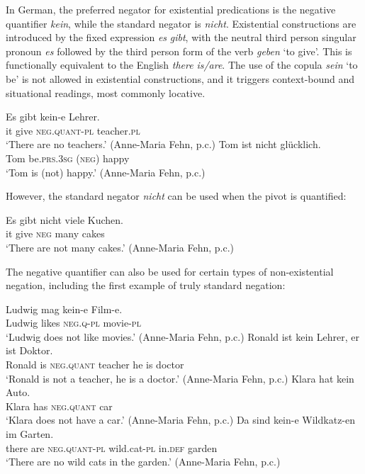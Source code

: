 \documentclass[output=paper,colorlinks,citecolor=brown]{langscibook}
\begin{document}
\begin{paperappendix}
\begin{unindented}

In German, the preferred negator for existential predications is the negative quantifier \textit{kein}, while the standard negator is \textit{nicht}. Existential constructions are introduced by the fixed expression \textit{es} \textit{gibt}, with the neutral third person singular pronoun \textit{es} followed by the third person form of the verb \textit{geben} `to give'. This is functionally equivalent to the English \textit{there} \textit{is/are}. The use of the copula \textit{sein} `to be' is not allowed in existential constructions, and it triggers context-bound and situational readings, most commonly locative. 
%
\begin{exe}\ex \gll Es gibt  kein-e Lehrer.  \\
it   give \textsc{neg.quant-pl} teacher.\textsc{pl} \\
    \glt `There are no teachers.' (Anne-Maria Fehn, p.c.)
\ex \gll Tom ist {\op}nicht{\cp} glücklich. \\
Tom be.\textsc{prs.3sg} (\textsc{neg}) happy \\
    \glt `Tom is (not) happy.' (Anne-Maria Fehn, p.c.)
    \end{exe}

However, the standard negator \textit{nicht} can be used when the pivot is quantified:
%
\begin{exe}\ex \gll Es gibt nicht viele   Kuchen. \\
it   give \textsc{neg}  many cakes \\
    \glt `There are not many cakes.' (Anne-Maria Fehn, p.c.)
    \end{exe}

The negative quantifier can also be used for certain types of non-existential negation, including the first example of truly standard negation:
%
\begin{exe}\ex \gll Ludwig mag kein-e Film-e.  \\
Ludwig likes \textsc{neg.q-pl} movie-\textsc{pl} \\
    \glt `Ludwig does not like movies.' (Anne-Maria Fehn, p.c.)
\ex \gll Ronald ist kein Lehrer, er ist Doktor.  \\
Ronald is  \textsc{neg.quant} teacher he is doctor \\
    \glt `Ronald is not a teacher, he is a doctor.' (Anne-Maria Fehn, p.c.)
\ex \gll Klara hat kein Auto. \\
Klara has \textsc{neg.quant} car \\
    \glt `Klara does not have a car.' (Anne-Maria Fehn, p.c.)
\ex \gll Da sind kein-e Wildkatz-en im Garten.  \\
there are \textsc{neg.quant-pl} wild.cat-\textsc{pl} in.\textsc{def} garden \\
    \glt `There are no wild cats in the garden.' (Anne-Maria Fehn, p.c.)
    \end{exe}


\end{unindented}
\end{paperappendix}
\end{document}
